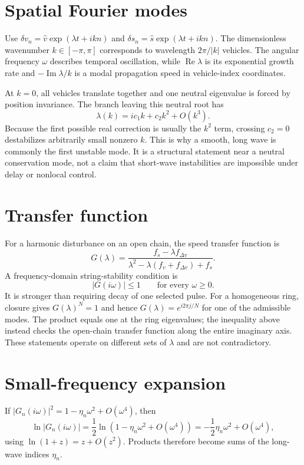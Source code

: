 \documentclass[11pt,a4paper,openany]{book}
\numberwithin{equation}{chapter}
\numberwithin{figure}{chapter}
\numberwithin{table}{chapter}
\newcommand{\Rea}{\operatorname{Re}}
\newcommand{\Ima}{\operatorname{Im}}
\begin{document}
\section{Spatial Fourier modes}
Use $\delta v_n=\hat v\exp(\lambda t+ikn)$ and $\delta s_n=\hat s\exp(\lambda t+ikn)$. The dimensionless wavenumber $k\in[-\pi,\pi]$ corresponds to wavelength $2\pi/|k|$ vehicles. The angular frequency $\omega$ describes temporal oscillation, while $\Rea\lambda$ is its exponential growth rate and $-\Ima\lambda/k$ is a modal propagation speed in vehicle-index coordinates.

At $k=0$, all vehicles translate together and one neutral eigenvalue is forced by position invariance. The branch leaving this neutral root has
\begin{equation}
\lambda(k)=ic_1k+c_2k^2+O(k^3).
\end{equation}
Because the first possible real correction is usually the $k^2$ term, crossing $c_2=0$ destabilizes arbitrarily small nonzero $k$. This is why a smooth, long wave is commonly the first unstable mode. It is a structural statement near a neutral conservation mode, not a claim that short-wave instabilities are impossible under delay or nonlocal control.

\section{Transfer function}
For a harmonic disturbance on an open chain, the speed transfer function is
\begin{equation}
G(\lambda)=\frac{f_s-\lambda f_{\Delta v}}
{\lambda^2-\lambda(f_v+f_{\Delta v})+f_s}.
\end{equation}
A frequency-domain string-stability condition is
\begin{equation}
|G(i\omega)|\le1\qquad\text{for every }\omega\ge0.
\end{equation}
It is stronger than requiring decay of one selected pulse. For a homogeneous ring, closure gives $G(\lambda)^N=1$ and hence $G(\lambda)=e^{i2\pi j/N}$ for one of the admissible modes. The product equals one at the ring eigenvalues; the inequality above instead checks the open-chain transfer function along the entire imaginary axis. These statements operate on different sets of $\lambda$ and are not contradictory.

\section{Small-frequency expansion}
If $|G_n(i\omega)|^2=1-\eta_n\omega^2+O(\omega^4)$, then
\begin{equation}
\ln|G_n(i\omega)|=\frac12\ln(1-\eta_n\omega^2+O(\omega^4))
=-\frac12\eta_n\omega^2+O(\omega^4),
\end{equation}
using $\ln(1+z)=z+O(z^2)$. Products therefore become sums of the long-wave indices $\eta_n$.
\end{document}
